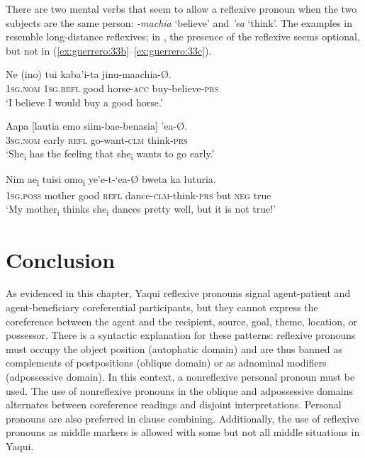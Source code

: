\documentclass[output=paper]{langscibook}
\begin{document}
There are two mental verbs that seem to allow a reflexive pronoun when the two subjects are the same person: \textit{{}-machia} ‘believe’ and \textit{’ea} ‘think’. The examples in  resemble long-distance reflexives; in , the presence of the reflexive seems optional, but not in (\ref{ex:guerrero:33b}--\ref{ex:guerrero:33c}).



\ea%
    \label{ex:guerrero:33}

\ea
\label{ex:guerrero:33a}
\gll Ne  (ino)  tui  kaba’i-ta    jinu-maachia-Ø.\\
  \textsc{1sg.nom}  \textsc{1sg.refl}  good  horse-\textsc{acc}    buy-believe\textsc{{}-prs}\\
\glt ‘I believe I would buy a good horse.’

\ex
\label{ex:guerrero:33b}
\gll Aapa  [lautia  emo  siim-bae-benasia]  ’ea-Ø.\\
  3\textsc{sg.nom}  early      \textsc{refl}  go-want\textsc{{}-clm} think-\textsc{prs}\\
\glt ‘She\textsubscript{i} has the feeling that she\textsubscript{i} wants to go early.’

\ex
\label{ex:guerrero:33c}
\gll Nim  ae\textsubscript{i}  tuisi  omo\textsubscript{i} ye’e-t-‘ea-Ø  bweta  ka  luturia.\\
  \textsc{1sg.poss}  mother  good  \textsc{refl}  dance-\textsc{clm-}think-\textsc{prs}  but  \textsc{neg}  true\\
\glt ‘My mother\textsubscript{i} thinks she\textsubscript{i} dances pretty well, but it is not true!’
\z
\z



\section{Conclusion}\label{sec:guerrero:6}



As evidenced in this chapter, Yaqui reflexive pronouns signal agent-patient and agent-beneficiary coreferential participants, but they cannot express the coreference between the agent and the recipient, source, goal, theme, location, or possessor. There is a syntactic explanation for these patterns: reflexive pronouns must occupy the object position (autophatic domain) and are thus banned as complements of postpositions (oblique domain) or as adnominal modifiers (adpossessive domain). In this context, a nonreflexive personal pronoun must be used. The use of nonreflexive pronouns in the oblique and adpossessive domains alternates between coreference readings and disjoint interpretations. Personal pronouns are also preferred in clause combining. Additionally, the use of reflexive pronouns as middle markers is allowed with some but not all middle situations in Yaqui.
\end{document}
